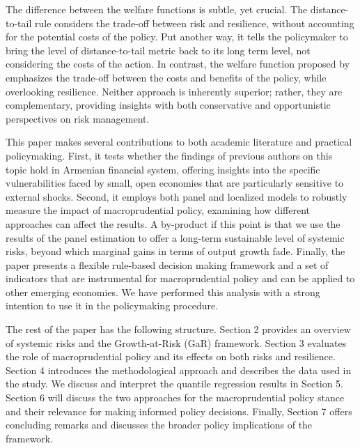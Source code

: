 \documentclass[12pt,a4paper]{article}
\begin{document}
The difference between the welfare functions is subtle, yet crucial. The distance-to-tail rule considers the trade-off between risk and resilience, without accounting for the potential costs of the policy. Put another way, it tells the policymaker to bring the level of distance-to-tail metric back to its long term level, not considering the costs of the action. In contrast, the welfare function proposed by \citet{suarez2022} emphasizes the trade-off between the costs and benefits of the policy, while overlooking resilience. Neither approach is inherently superior; rather, they are complementary, providing insights with both conservative and opportunistic perspectives on risk management.

This paper makes several contributions to both academic literature and practical policymaking. First, it tests whether the findings of previous authors on this topic hold in Armenian financial system, offering insights into the specific vulnerabilities faced by small, open economies that are particularly sensitive to external shocks. Second, it employs both panel and localized models to robustly measure the impact of macroprudential policy, examining how different approaches can affect the results. A by-product if this point is that we use the results of the panel estimation to offer a long-term sustainable level of systemic risks, beyond which marginal gains in terms of output growth fade. Finally, the paper presents a flexible rule-based decision making framework and a set of indicators that are instrumental for macroprudential policy and can be applied to other emerging economies. We have performed this analysis with a strong intention to use it in the policymaking procedure.

The rest of the paper has the following structure. Section 2 provides an overview of systemic risks and the Growth-at-Risk (GaR) framework. Section 3 evaluates the role of macroprudential policy and its effects on both risks and resilience. Section 4 introduces the methodological approach and describes the data used in the study. We discuss and interpret the quantile regression results in Section 5. Section 6 will discuss the two approaches for the macroprudential policy stance and their relevance for making informed policy decisions. Finally, Section 7 offers concluding remarks and discusses the broader policy implications of the framework.
\end{document}
